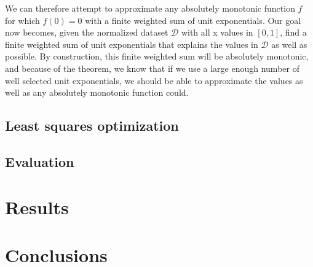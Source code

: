 \documentclass[12pt,a4paper]{article}
\begin{document}
We can therefore attempt to approximate any absolutely monotonic function $f$ for which $f(0) = 0$ with a finite weighted sum of unit exponentials. Our goal now becomes, given the normalized dataset $\mathcal{D}$ with all x values in $[0,1]$, find a finite weighted sum of unit exponentials that explains the values in $\mathcal{D}$ as well as possible. By construction, this finite weighted sum will be absolutely monotonic, and because of the theorem, we know that if we use a large enough number of well selected unit exponentials, we should be able to approximate the values as well as any absolutely monotonic function could.

\subsection{Least squares optimization}
\label{least_squares}

\subsection{Evaluation}

\section{Results}

\section{Conclusions}

\dobibliography
\end{document}
